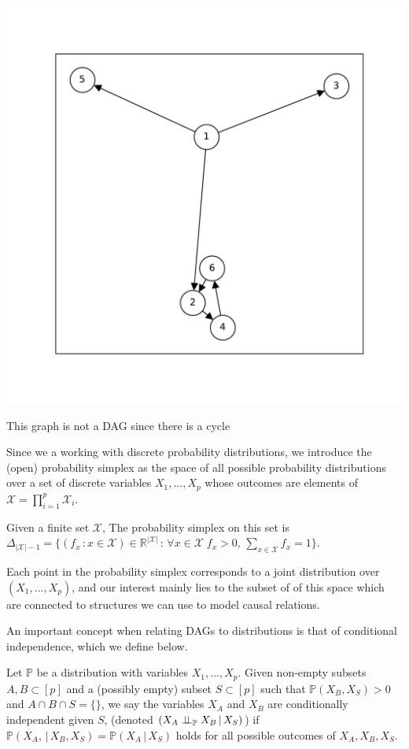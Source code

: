\documentclass{tufte-book}
\begin{document}
 \begin{marginfigure} \includegraphics[width=\linewidth]{ ./figures/dagneg.pdf}\caption{ This graph is not a DAG since there is a cycle} \end{marginfigure} 


Since we a working with discrete probability distributions, we introduce the (open) probability simplex as the space of all possible probability distributions over a set of discrete variables \(X_1,...,X_p\) whose outcomes are elements of \(\mathcal{X}=\prod_{i=1}^p \mathcal{X}_i\).

\begin{definition}\label{probsimplex}
Given a finite set $\mathcal{X}$, The probability simplex on this set is \\ $\Delta_{|\mathcal{X}|-1} = \{ (f_x \, : x \in \mathcal{X}) \in \mathbb{R}^{|\mathcal{X}|} \, : \, \forall x \in \mathcal{X} \; f_x > 0, \, \sum_{x\in \mathcal{X}}f_x =1\}.$
\end{definition}

Each point in the probability simplex corresponds to a joint distribution over \((X_1,...,X_p)\), and our interest mainly lies to the subset of of this space which are connected to structures we can use to model causal relations.


An important concept when relating DAGs to distributions is that of conditional independence, which we define below.
\begin{definition}\label{def:cirel}
Let  $\mathbb{P}$ be a distribution with variables $X_1,...,X_p$. Given non-empty subsets $A,B \subset [p]$ and a (possibly empty) subset $S \subset [p]$ such that $\mathbb{P}(X_B, X_S)>0$ and $A \cap B \cap S = \{\}$, we say the variables $X_A$ and $X_B$ are conditionally independent given $S$, (denoted $(X_A\perp \!\!\! \perp_{\mathbb{P}} X_B \,|\, X_S)$) if $\mathbb{P}(X_A, \,|\,X_B, X_S) = \mathbb{P}(X_A \, |\, X_S)$ holds for all possible outcomes of $X_A,X_B,X_S$.
\end{definition}
\end{document}
